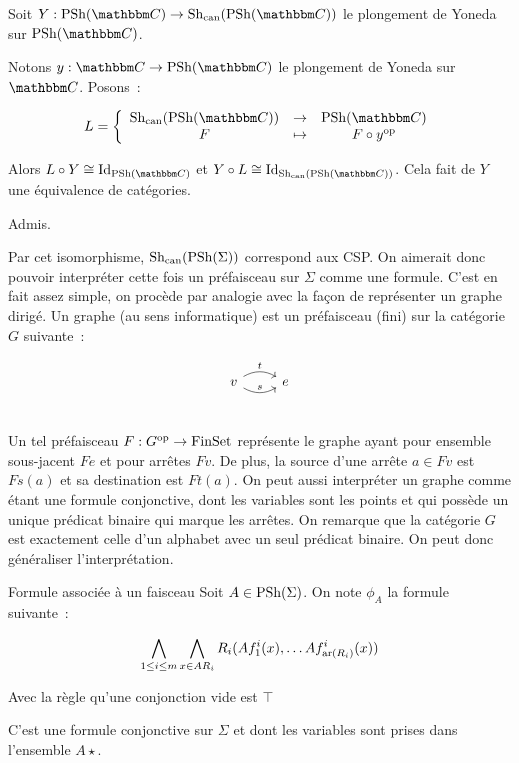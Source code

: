 \begin{prop}\label{canEq}
    Soit $Y : \psh(\C)\rightarrow\shc(\psh(\C))$ le plongement de Yoneda sur
    $\psh(\C)$.

    Notons $y : \C\rightarrow\psh(\C)$ le plongement de Yoneda sur $\C$. Posons~:

    \[L = \left\{\begin{array}{ccc}
             \shc(\psh(\C)) & \rightarrow & \psh(\C) \\
             F              & \mapsto     & F\circ y^\text{op} \\
    \end{array}\right.\]

    Alors $L\circ Y\cong\text{Id}_{\psh(\C)}$ et
    $Y\circ L\cong\text{Id}_{\shc(\psh(\C))}$. Cela fait de $Y$ une équivalence de
    catégories.
\end{prop}

\begin{pv}
    Admis.
\end{pv}

Par cet isomorphisme, $\text{Sh}_\text{can}(\text{PSh}(\Sigma))$ correspond aux CSP. On aimerait donc pouvoir
interpréter cette fois un préfaisceau sur $\Sigma$ comme une formule. C'est en fait assez
simple, on procède par analogie avec la façon de représenter un graphe dirigé. Un graphe
(au sens informatique) est un préfaisceau (fini) sur la catégorie $G$ suivante~:

\[\begin{tikzcd}
    v \arrow[r, bend right, "s"] \arrow[r, bend left, "t"] & e \\
\end{tikzcd}\]

Un tel préfaisceau $F : G^{\text{op}}\rightarrow\text{FinSet}$ représente le graphe ayant pour
ensemble sous-jacent $Fe$ et pour arrêtes $Fv$. De plus, la source d'une arrête $a\in Fv$
est $Fs(a)$ et sa destination est $Ft(a)$. On peut aussi interpréter un graphe comme
étant une formule conjonctive, dont les variables sont les points et qui possède un
unique prédicat binaire qui marque les arrêtes. On remarque que la catégorie $G$ est
exactement celle d'un alphabet avec un seul prédicat binaire. On peut donc généraliser
l'interprétation.

\begin{defi}{Formule associée à un faisceau}
    Soit $A\in\text{PSh}(\Sigma)$. On note $\phi_A$ la formule suivante~:
    
    \[\bigwedge_{1\leq i\leq m} \bigwedge_{x\in AR_i}
            R_i(Af_1^i(x), \dots Af_{\text{ar}(R_i)}^i(x)) \]

    Avec la règle qu'une conjonction vide est $\top$

    C'est une formule conjonctive sur $\Sigma$ et dont les variables sont prises dans
    l'ensemble $A\star$.
\end{defi}

